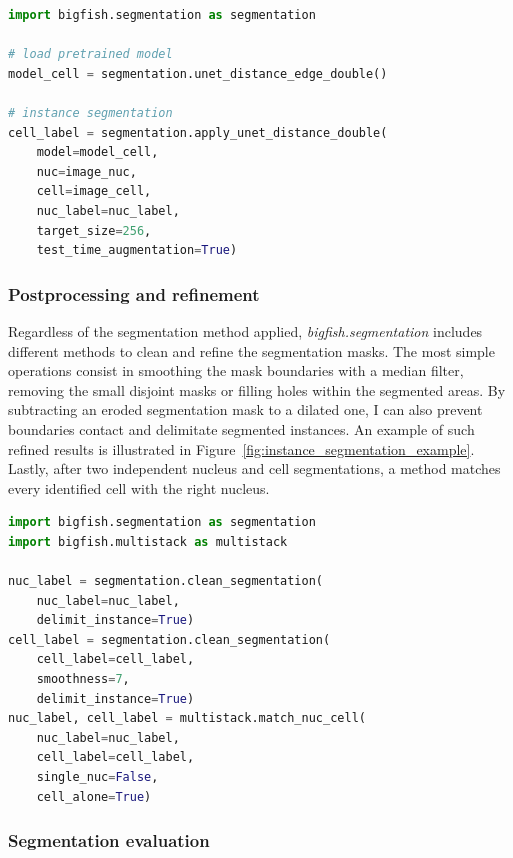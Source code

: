 \begin{minipage}{0.9\textwidth}
\begin{lstlisting}[language=Python]
import bigfish.segmentation as segmentation

# load pretrained model
model_cell = segmentation.unet_distance_edge_double()

# instance segmentation
cell_label = segmentation.apply_unet_distance_double(
    model=model_cell,
    nuc=image_nuc,
    cell=image_cell,
    nuc_label=nuc_label,
    target_size=256,
	test_time_augmentation=True)
\end{lstlisting}
\end{minipage}

\subsubsection{Postprocessing and refinement}

Regardless of the segmentation method applied, \emph{bigfish.segmentation} includes different methods to clean and refine the segmentation masks.
The most simple operations consist in smoothing the mask boundaries with a median filter, removing the small disjoint masks or filling holes within the segmented areas.
By subtracting an eroded segmentation mask to a dilated one, I can also prevent boundaries contact and delimitate segmented instances.
An example of such refined results is illustrated in Figure~\ref{fig:instance_segmentation_example}.
Lastly, after two independent nucleus and cell segmentations, a method matches every identified cell with the right nucleus.\\

\begin{minipage}{0.9\textwidth}
\begin{lstlisting}[language=Python]
import bigfish.segmentation as segmentation
import bigfish.multistack as multistack

nuc_label = segmentation.clean_segmentation(
	nuc_label=nuc_label,
	delimit_instance=True)
cell_label = segmentation.clean_segmentation(
	cell_label=cell_label,
	smoothness=7,
	delimit_instance=True)
nuc_label, cell_label = multistack.match_nuc_cell(
	nuc_label=nuc_label,
	cell_label=cell_label,
	single_nuc=False,
	cell_alone=True)
\end{lstlisting}
\end{minipage}

\subsubsection{Segmentation evaluation}

